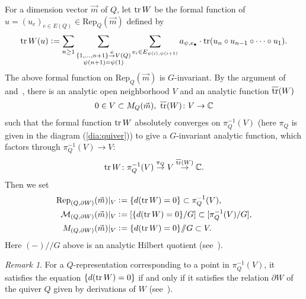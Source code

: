 \documentclass[11pt]{amsart}
\theoremstyle{plain}
\theoremstyle{definition}
\theoremstyle{remark}
\newtheorem{rmk}[thm]{Remark}
\newcommand{\sslash}{/\!\!/}
\newcommand{\mM}{\mathcal{M}}
\newcommand{\tr}{\mathop{\rm tr}\nolimits}
\begin{document}
For a dimension vector $\vec{m}$
of $Q$, let $\tr W$ be the formal function 
of $u=(u_e)_{e\in E(Q)} \in \mathrm{Rep}_Q(\vec{m})$ defined by
\begin{align*}
\tr W(u) \cneq \sum_{n\ge 1}
\sum_{\begin{subarray}{c}
\{1, \ldots, n+1\} \stackrel{\psi}{\to} V(Q) \\
\psi(n+1)=\psi(1)
\end{subarray}}
\sum_{e_i \in E_{\psi(i), \psi(i+1)}}
a_{\psi, e_{\bullet}} \cdot \tr(u_n \circ u_{n-1} 
\circ \cdots \circ u_1).
\end{align*}
The above formal function on 
$\mathrm{Rep}_Q(\vec{m})$ is $G$-invariant. 
By the argument of~\cite[Lemma~2.10]{Todstack}
and~\cite[Lemma~4.9]{TodGV}, 
there is an 
analytic open neighborhood $V$ 
and an analytic function $\overline{\tr}(W)$
\begin{align}\label{V:open}
0 \in V \subset M_Q(\vec{m}), \ 
\overline{\tr}(W) \colon V \to \mathbb{C}
\end{align}
such that the formal function 
$\tr W$
absolutely converges on 
$\pi_Q^{-1}(V)$
(here $\pi_Q$ is given in the diagram (\ref{dia:quiver})) to give a 
$G$-invariant analytic function, which factors 
through $\pi_Q^{-1}(V) \to V$: 
\begin{align}\label{tr:W}
\tr W \colon \pi_Q^{-1}(V) \stackrel{\pi_Q}{\to} V
\stackrel{\overline{\tr}(W)}{\to}
\mathbb{C}. 
\end{align}
Then we set
\begin{align}\label{def:MW}
\mathrm{Rep}_{(Q, \partial W)}(\vec{m})|_{V} &\cneq 
\{ d(\tr W)=0\} \subset \pi_Q^{-1}(V), \\ 
\notag
\mM_{(Q, \partial W)}(\vec{m})|_{V}&
 \cneq \left[\{ d(\tr W)=0\}/G \right] \subset [\pi_Q^{-1}(V)/G], \\
\notag
M_{(Q, \partial W)}(\vec{m})|_{V}& \cneq \{ d(\tr W)=0\} \sslash G
\subset V. 
\end{align}
Here $(-)\sslash G$ above is an analytic Hilbert quotient 
(see~\cite{MR1631577, MR3394374, Todstack}).

\begin{rmk}\label{rmk:pW}
For a $Q$-representation corresponding to 
a point in $\pi_Q^{-1}(V)$, it satisfies the 
equation $\{d(\tr W)=0\}$ if and only if it satisfies the relation 
$\partial W$ of the quiver $Q$ given by derivations
of $W$ (see~\cite[Subsection~2.6]{Todstack}). 
\end{rmk}
\end{document}
